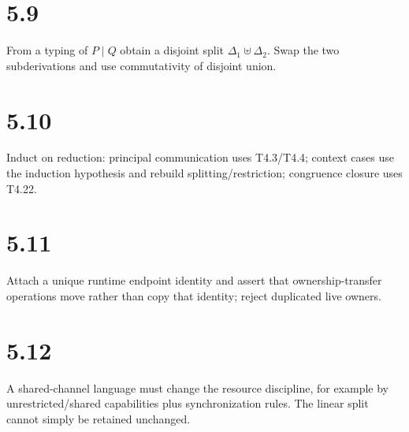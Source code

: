 \section*{5.9}
From a typing of $P\mid Q$ obtain a disjoint split $\Delta_1\uplus\Delta_2$. Swap the two subderivations and use commutativity of disjoint union.

\section*{5.10}
Induct on reduction: principal communication uses T4.3/T4.4; context cases use the induction hypothesis and rebuild splitting/restriction; congruence closure uses T4.22.

\section*{5.11}
Attach a unique runtime endpoint identity and assert that ownership-transfer operations move rather than copy that identity; reject duplicated live owners.

\section*{5.12}
A shared-channel language must change the resource discipline, for example by unrestricted/shared capabilities plus synchronization rules. The linear split cannot simply be retained unchanged.
